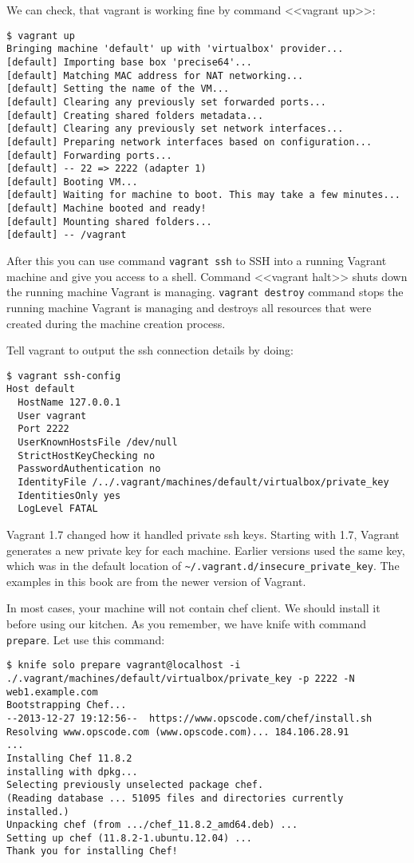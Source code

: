 We can check, that vagrant is working fine by command <<vagrant up>>:

\begin{lstlisting}[label=lst:my-cloud-vagrant4]
$ vagrant up
Bringing machine 'default' up with 'virtualbox' provider...
[default] Importing base box 'precise64'...
[default] Matching MAC address for NAT networking...
[default] Setting the name of the VM...
[default] Clearing any previously set forwarded ports...
[default] Creating shared folders metadata...
[default] Clearing any previously set network interfaces...
[default] Preparing network interfaces based on configuration...
[default] Forwarding ports...
[default] -- 22 => 2222 (adapter 1)
[default] Booting VM...
[default] Waiting for machine to boot. This may take a few minutes...
[default] Machine booted and ready!
[default] Mounting shared folders...
[default] -- /vagrant
\end{lstlisting}

After this you can use command \lstinline!vagrant ssh! to SSH into a running Vagrant machine and give you access to a shell. Command <<vagrant halt>> shuts down the running machine Vagrant is managing. \lstinline!vagrant destroy! command stops the running machine Vagrant is managing and destroys all resources that were created during the machine creation process.

Tell vagrant to output the ssh connection details by doing:

\begin{lstlisting}[label=lst:my-cloud-vagrant-ssh-config]
$ vagrant ssh-config
Host default
  HostName 127.0.0.1
  User vagrant
  Port 2222
  UserKnownHostsFile /dev/null
  StrictHostKeyChecking no
  PasswordAuthentication no
  IdentityFile /../.vagrant/machines/default/virtualbox/private_key
  IdentitiesOnly yes
  LogLevel FATAL
\end{lstlisting}

Vagrant 1.7 changed how it handled private ssh keys. Starting with 1.7, Vagrant generates a new private key for each machine. Earlier versions used the same key, which was in the default location of \lstinline!~/.vagrant.d/insecure_private_key!. The examples in this book are from the newer version of Vagrant.

In most cases, your machine will not contain chef client. We should install it before using our kitchen. As you remember, we have knife with command \lstinline!prepare!. Let use this command:

\begin{lstlisting}[label=lst:my-cloud-vagrant5]
$ knife solo prepare vagrant@localhost -i ./.vagrant/machines/default/virtualbox/private_key -p 2222 -N web1.example.com
Bootstrapping Chef...
--2013-12-27 19:12:56--  https://www.opscode.com/chef/install.sh
Resolving www.opscode.com (www.opscode.com)... 184.106.28.91
...
Installing Chef 11.8.2
installing with dpkg...
Selecting previously unselected package chef.
(Reading database ... 51095 files and directories currently installed.)
Unpacking chef (from .../chef_11.8.2_amd64.deb) ...
Setting up chef (11.8.2-1.ubuntu.12.04) ...
Thank you for installing Chef!
\end{lstlisting}

